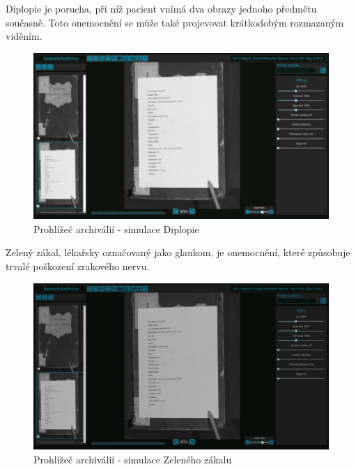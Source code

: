 \newpage
\noindent
Diplopie je porucha, při níž pacient vnímá dva obrazy jednoho předmětu současně. Toto onemocnění se může také projevovat krátkodobým rozmazaným viděním.
\begin{figure}[htbp]
\centering
    \includegraphics[scale=.35]{obrazky-figures/testing/figma-eye-defects/Gallery Page - Ghosting.png}
    \caption{Prohlížeč archiválií - simulace Diplopie}
\end{figure}

\noindent
Zelený zákal, lékařsky označovaný jako glaukom, je onemocnění, které způsobuje trvalé poškození zrakového nervu.
\begin{figure}[htbp]
\centering
    \includegraphics[scale=.35]{obrazky-figures/testing/figma-eye-defects/Gallery Page - Loss of Contrast.png}
    \caption{Prohlížeč archiválií - simulace Zeleného zákalu}
\end{figure}

